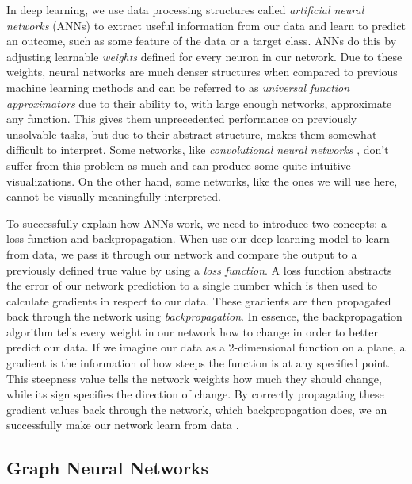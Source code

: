 \documentclass[times, utf8, diplomski, english]{fer_eng}
\begin{document}
In deep learning, we use data processing structures called \textit{artificial neural networks} (ANNs) to extract useful information from our data and learn to predict an outcome, such as some feature of the data or a target class. ANNs do this by adjusting learnable \textit{weights} defined for every neuron in our network. Due to these weights, neural networks are much denser structures when compared to previous machine learning methods and can be referred to as \textit{universal function approximators} \cite{uni_approx} due to their ability to, with large enough networks, approximate any function. This gives them unprecedented performance on previously unsolvable tasks, but due to their abstract structure, makes them somewhat difficult to interpret. Some networks, like \textit{convolutional neural networks} \cite{CNN}, don't suffer from this problem as much and can produce some quite intuitive visualizations. On the other hand, some networks, like the ones we will use here, cannot be visually meaningfully interpreted.

To successfully explain how ANNs work, we need to introduce two concepts: a loss function and backpropagation. When use our deep learning model to learn from data, we pass it through our network and compare the output to a previously defined true value by using a \textit{loss function}. A loss function abstracts the error of our network prediction to a single number which is then used to calculate gradients in respect to our data. These gradients are then propagated back through the network using \textit{backpropagation}. In essence, the backpropagation algorithm tells every weight in our network how to change in order to better predict our data. If we imagine our data as a 2-dimensional function on a plane, a gradient is the information of how steeps the function is at any specified point. This steepness value tells the network weights how much they should change, while its sign specifies the direction of change. By correctly propagating these gradient values back through the network, which backpropagation does, we an successfully make our network learn from data \cite{Goodfellow-et-al-2016}.

\subsection{Graph Neural Networks}
\label{subsec:graph neural networks}
\end{document}
